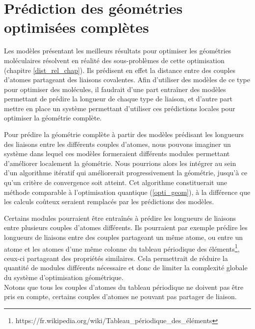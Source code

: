 \section{Prédiction des géométries optimisées complètes}

\label{perspectives_geom_complete}

\par Les modèles présentant les meilleurs résultats pour optimiser les géométries moléculaires résolvent en réalité des sous-problèmes de cette optimisation (chapitre \ref{dist_rel_chap}). Ils prédisent en effet la distance entre des couples d'atomes partageant des liaisons covalentes. Afin d'utiliser des modèles de ce type pour optimiser des molécules, il faudrait d'une part entraîner des modèles permettant de prédire la longueur de chaque type de liaison, et d'autre part mettre en place un système permettant d'utiliser ces prédictions locales pour optimiser la géométrie complète.\\


\par Pour prédire la géométrie complète à partir des modèles prédisant les longueurs des liaisons entre les différents couples d'atomes, nous pouvons imaginer un système dans lequel ces modèles formeraient différents modules permettant d'améliorer localement la géométrie. Nous pourrions alors les intégrer au sein d'un algorithme itératif qui améliorerait progressivement la géométrie, jusqu'à ce qu'un critère de convergence soit atteint. Cet algorithme constituerait une méthode comparable à l'optimisation quantique (\ref{opti_geom}), à la différence que les calculs coûteux seraient remplacés par les prédictions des modèles.\\

\par Certains modules pourraient être entraînés à prédire les longueurs de liaisons entre plusieurs couples d'atomes différents. Ils pourraient par exemple prédire les longueurs de liaisons entre des couples partageant un même atome, ou entre un atome et les atomes d'une même colonne du tableau périodique des éléments\footnote{https://fr.wikipedia.org/wiki/Tableau\_périodique\_des\_éléments}, ceux-ci partageant des propriétés similaires. Cela permettrait de réduire la quantité de modules différents nécessaire et donc de limiter la complexité globale du système d'optimisation géométrique.\\
Notons que tous les couples d'atomes du tableau périodique ne doivent pas être pris en compte, certains couples d'atomes ne pouvant pas partager de liaison.\\


